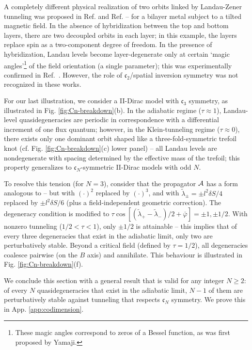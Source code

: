 \documentclass[aps, showpacs, twocolumn, notitlepage, superscriptaddress]{revtex4-1}
\begin{document}
A completely different physical realization of two orbits linked by Landau-Zener tunneling was proposed in Ref.  and Ref.  -- for a bilayer {metal} subject to a tilted magnetic field. {In the absence of hybridization between the top and bottom layers, there are two decoupled orbits in each layer; in this example, the layers replace spin as a two-component degree of freedom. In the presence of hybridization,   Landau levels become layer-degenerate} only  at certain `magic angles'\footnote{These magic angles correspond to zeros of a Bessel function, as was first proposed by Yamaji.\cite{yamaji_angle_1989}} of the field orientation (a single parameter); this was experimentally confirmed in Ref.\ . However, the role of $\mathfrak{c}_2${/spatial inversion} symmetry was not recognized in these works. 

For our last illustration, we consider a II-Dirac model with $\mathfrak{c}_3$  symmetry, as illustrated in Fig. \ref{fig:Cn-breakdown}(b). In the adiabatic regime ($\tau{\approx}1$), Landau-level quasidegeneracies are periodic in correspondence with a differential increment of one flux quantum; however, in the Klein-tunneling regime ($\tau{\approx}0$), there exists only one dominant orbit shaped like a three-fold-symmetric trefoil knot (cf. Fig. \ref{fig:Cn-breakdown}(c) lower panel) --  all Landau levels are nondegenerate with spacing determined by the effective mass of the trefoil; this property generalizes to $\mathfrak{c}_N$-symmetric II-Dirac models with odd $N$.   

To resolve this tension (for $N{=}3$), consider that the propagator ${\cal A}$ has a form analogous to  -- but with $(\cdot)^2$ replaced by $(\cdot)^3$, and with $\tilde{\lambda}_\pm{=}{\pm} l^2\delta S/4$ replaced by $\pm l^2\delta S/6$ (plus a field-independent geometric correction). The degeneracy condition is modified to $\tau\cos[(\tilde{\lambda}_+{-}\tilde{\lambda}_-)/2{+}\bar{\varphi}]{=}{\pm} 1,{\pm} 1/2$. With nonzero tunneling ($1/2{<}\tau {<}1$), only $\pm 1/2$ is attainable -- this implies that of every three degeneracies that exist in the adiabatic limit, only two are perturbatively stable. Beyond a critical field  (defined by $\tau{=}1/2$), all degeneracies coalesce pairwise (on the $B$ axis) and annihilate. This behaviour is illustrated in Fig. \ref{fig:Cn-breakdown}(f).

We conclude this section with a general result that is valid for any integer $N{\geq}2$: of every $N$ quasidegeneracies that exist in the adiabatic limit, $N{-}1$ of them are perturbatively stable against tunneling that respects  $\mathfrak{c}_N$ symmetry. We prove this in App. \ref{app:codimension}.
\end{document}
